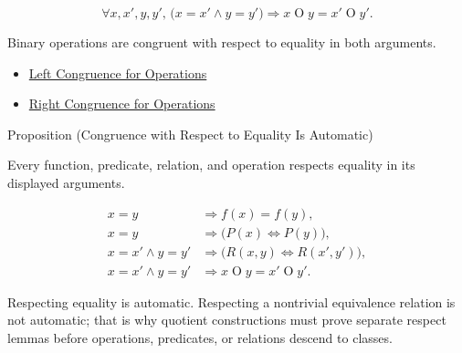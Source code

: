 \begin{remark*}
\[
\forall x,x',y,y',\,
\bigl(x=x'\land y=y'\bigr)
\Longrightarrow
x\mathbin{O}y=x'\mathbin{O}y'.
\]
\end{remark*}

\begin{remark*}[Interpretation]
Binary operations are congruent with respect to equality in both arguments.
\end{remark*}

\begin{dependencies}
\begin{itemize}
  \item \hyperref[prop:substitution-preserves-operations-left]{Left Congruence for Operations}
  \item \hyperref[prop:substitution-preserves-operations-right]{Right Congruence for Operations}
\end{itemize}
\end{dependencies}

\begin{propositionbox}{Proposition (Congruence with Respect to Equality Is Automatic)}
\begin{proposition}
\label{prop:congruence-with-respect-to-equality-is-automatic}
Every function, predicate, relation, and operation respects equality in its
displayed arguments.
\end{proposition}
\end{propositionbox}

\begin{remark*}
\[
\begin{aligned}
x=y&\Longrightarrow f(x)=f(y),\\
x=y&\Longrightarrow \bigl(P(x)\Longleftrightarrow P(y)\bigr),\\
x=x'\land y=y'
&\Longrightarrow \bigl(R(x,y)\Longleftrightarrow R(x',y')\bigr),\\
x=x'\land y=y'
&\Longrightarrow x\mathbin{O}y=x'\mathbin{O}y'.
\end{aligned}
\]
\end{remark*}

\begin{remark*}[Interpretation]
Respecting equality is automatic. Respecting a nontrivial equivalence relation
is not automatic; that is why quotient constructions must prove separate
respect lemmas before operations, predicates, or relations descend to classes.
\end{remark*}

